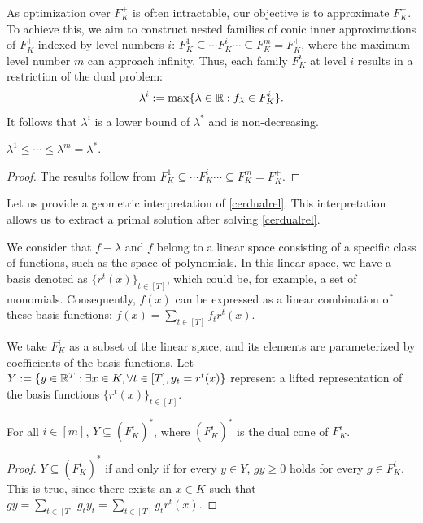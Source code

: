 As optimization over $F^{+}_{K}$ is often intractable, our objective is to approximate $F^{+}_{K}$. To achieve this, we aim to construct nested families of conic inner approximations of $F^{+}_{K}$ indexed by level numbers $i$: $F^1_{K} \subseteq \cdots F^i_{K} \cdots \subseteq F^m_{K} = F^{+}_{K}$, where the maximum level number $m$ can approach infinity. Thus, each family $F^i_{K}$ at level $i$ results in a restriction of the dual problem:
\begin{equation}
\label{cerdualrel}
   \lambda^i := \max \{\lambda\in \mathbb R: f_\lambda \in F^{i}_{K}\}.
\end{equation}
It follows that $\lambda^i$ is a lower bound  of $\lambda^\ast$ and is non-decreasing.
\begin{lemma}
    $ \lambda^1 \le \cdots \le \lambda^m = \lambda^\ast.$
\end{lemma}
\begin{proof}
    The results follow from  $F^1_{K} \subseteq \cdots F^i_{K}  \cdots \subseteq F^m_{K} =  F^{+}_{K}$.
\end{proof}

Let us provide a geometric interpretation of \eqref{cerdualrel}. This interpretation allows us to extract a primal solution after solving \eqref{cerdualrel}.

We consider that $f - \lambda$ and $f$ belong to a linear space consisting of a specific class of functions, such as the space of polynomials. In this linear space, we have a basis denoted as $\{r^t(x)\}_{t \in [T]}$, which could be, for example, a set of monomials. Consequently, $f(x)$ can be expressed as a linear combination of these basis functions: $f(x) = \sum_{t \in [T]} f_t r^t(x)$.

We take $F^{i}_{K}$ as a subset of the linear space, and its elements are parameterized by coefficients of the basis functions. Let $Y := \{y \in \mathbb R^T: \exists x \in K, \forall t \in [T], y_t = r^t(x)\}$ represent a lifted representation of the basis functions $\{r^t(x)\}_{t \in [T]}$.


 \begin{lemma}
    For all $i \in [m]$, $Y \subseteq (F^{i}_{K})^{\ast}$, where $(F^{i}_{K})^{\ast}$ is the dual cone of $F^{i}_{K}$.
 \end{lemma}
 \begin{proof}
     $Y \subseteq (F^{i}_{K})^{\ast}$ if and only if for every $y \in Y$, $gy \ge 0$ holds for every $g \in F^{i}_{K}$. This is true, since there exists an $x \in K$ such that $gy = \sum_{t \in [T]} g_t y_t = \sum_{t \in [T]} g_t r^t(x)$.
 \end{proof}

